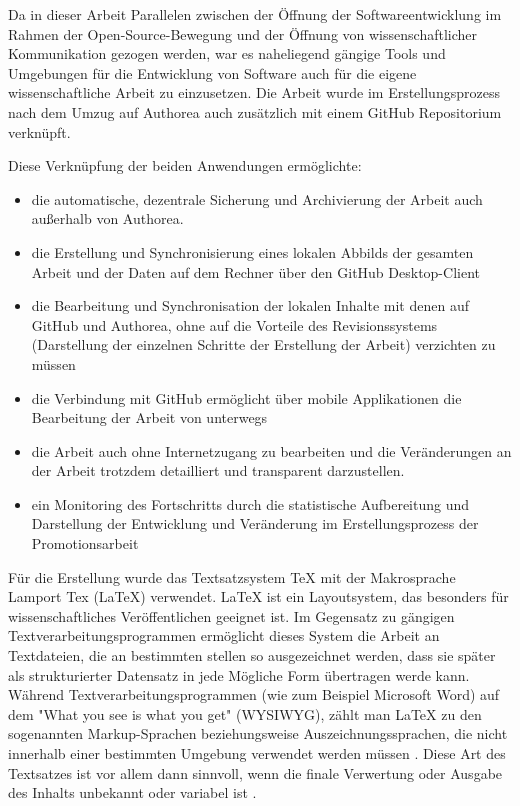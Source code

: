 Da in dieser Arbeit Parallelen zwischen der Öffnung der Softwareentwicklung im Rahmen der Open-Source-Bewegung und der Öffnung von wissenschaftlicher Kommunikation gezogen werden, war es naheliegend gängige Tools und Umgebungen für die Entwicklung von Software auch für die eigene wissenschaftliche Arbeit zu einzusetzen. Die Arbeit wurde im Erstellungsprozess nach dem Umzug auf Authorea auch zusätzlich mit einem GitHub Repositorium verknüpft.

Diese Verknüpfung der beiden Anwendungen ermöglichte:
\begin{itemize}
\item die automatische, dezentrale Sicherung und Archivierung der Arbeit auch außerhalb von Authorea.
\item die Erstellung und Synchronisierung eines lokalen Abbilds der gesamten Arbeit und der Daten auf dem Rechner über den GitHub Desktop-Client
\item die Bearbeitung und Synchronisation der lokalen Inhalte mit denen auf GitHub und Authorea, ohne auf die Vorteile des Revisionssystems (Darstellung der einzelnen Schritte der Erstellung der Arbeit) verzichten zu müssen
\item die Verbindung mit GitHub ermöglicht über mobile Applikationen die Bearbeitung der Arbeit von unterwegs
\item die Arbeit auch ohne Internetzugang zu bearbeiten und die Veränderungen an der Arbeit trotzdem detailliert und transparent darzustellen.
\item ein Monitoring des Fortschritts durch die statistische Aufbereitung und Darstellung der Entwicklung und Veränderung im Erstellungsprozess der Promotionsarbeit
\end{itemize}

Für die Erstellung wurde das Textsatzsystem TeX mit der Makrosprache Lamport Tex (LaTeX) verwendet. LaTeX ist ein Layoutsystem, das besonders für wissenschaftliches Veröffentlichen geeignet ist. Im Gegensatz zu gängigen Textverarbeitungsprogrammen ermöglicht dieses System die Arbeit an Textdateien, die an bestimmten stellen so ausgezeichnet werden, dass sie später als strukturierter Datensatz in jede Mögliche Form übertragen werde kann. Während Textverarbeitungsprogrammen (wie zum Beispiel Microsoft Word) auf dem "What you see is what you get" (WYSIWYG), zählt man LaTeX zu den sogenannten Markup-­Sprachen beziehungsweise Auszeichnungssprachen, die nicht innerhalb einer bestimmten Umgebung verwendet werden müssen \cite{Sievers_2012}. Diese Art des Textsatzes ist vor allem dann sinnvoll, wenn die finale Verwertung oder Ausgabe des Inhalts unbekannt oder variabel ist  \cite{braune_2007_latex}.

